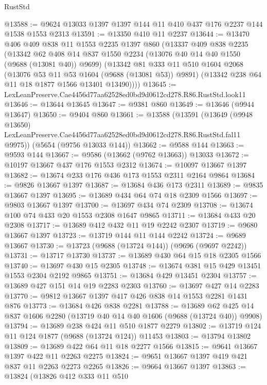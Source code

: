 \begin{lexlean}{RustStd}
\begin{coremodule}
@13588 := @9624 @13033 @1397 @1397 @144 @11 @410 @437 @176 @2237 @144 @1538 @1553 @2313
@13591 := @13350 @410 @11 @2237
@13644 := @13470
    @406
    @409
    @838
    @11
    @1553
    @2235
    @1397
    @860
    (@13337
      @409
      @838
      @2235
      (@13342
        @62
        @408
        @14
        @837
        @1550
        @2234
        (@13076 @40 @14 @40 @1550 (@9688 (@13081 @40)) @9699)
        (@13342
          @81
          @333
          @11
          @510
          @1604
          @2068
          (@13076 @53 @11 @53 @1604 (@9688 (@13081 @53)) @9891)
          (@13342 @238 @64 @11 @18 @1877 @1566 @13401 @13490))))
@13645 := LexLeanPreserve.Cae4456d77aa62528ed0bd9d0612cd278.R86.RustStd.look11
@13646 := @13644 @13645
@13647 := @9381 @860
@13649 := @13646 (@9944 @13647)
@13650 := @9404 @860
@13661 := @13588
    (@13591
      (@13649
        (@9948 @13650)
        LexLeanPreserve.Cae4456d77aa62528ed0bd9d0612cd278.R86.RustStd.fal11
        @9975))
    (@5654 (@9756 @13033 @144))
@13662 := @9588 @144
@13663 := @9593 @144
@13667 := @9586 (@13662 (@9762 @13663)) @13033
@13672 := @10197 @13667 @437 @176 @1553 @2312
@13674 := @10097 @13667 @1397
@13682 := @13674 @233 @176 @436 @173 @1553 @2311 @2164 @9864
@13684 := @9826 @13667 @1397
@13687 := @13684 @436 @173 @2311
@13689 := @9835 @13667 @1397
@13695 := @13689 @434 @64 @74 @18 @2309 @1566
@13697 := @9803 @13667 @1397
@13700 := @13697 @434 @74 @2309
@13708 := @13674 @100 @74 @433 @20 @1553 @2308 @1647 @9865
@13711 := @13684 @433 @20 @2308
@13717 := @13689 @412 @432 @11 @19 @2242 @2307
@13719 := @9680 @13667 @1397
@13723 := @13719 @144 @11 @144 @2242
@13724 := @9689 @13667
@13730 := @13723 (@9688 (@13724 @144)) (@9696 (@9697 @2242))
@13731 := @13717 @13730
@13737 := @13689 @430 @64 @15 @18 @2305 @1566
@13740 := @13697 @430 @15 @2305
@13748 := @13674 @381 @15 @429 @13451 @1553 @2304 @2192 @9865
@13751 := @13684 @429 @13451 @2304
@13757 := @13689 @427 @151 @14 @19 @2283 @2303
@13760 := @13697 @427 @14 @2283
@13770 := @9812 @13667 @1397 @417 @426 @838 @14 @1553 @2281 @1431 @876
@13773 := @13684 @426 @838 @2281
@13788 := @13689 @62 @425 @14 @837 @1606 @2280 (@13719 @40 @14 @40 @1606 (@9688 (@13724 @40)) @9908)
@13794 := @13689 @238 @424 @11 @510 @1877 @2279
@13802 := @13719 @124 @11 @124 @1877 (@9688 (@13724 @124)) @11453
@13803 := @13794 @13802
@13809 := @13689 @422 @64 @11 @18 @2277 @1566
@13815 := @9641 @13667 @1397 @422 @11 @2263 @2275
@13824 := @9651 @13667 @1397 @419 @421 @837 @11 @2263 @2273 @2265
@13826 := @9664 @13667 @1397
@13863 := @13824
    (@13826
      @412
      @333
      @11
      @510

\end{coremodule}
\end{lexlean}
